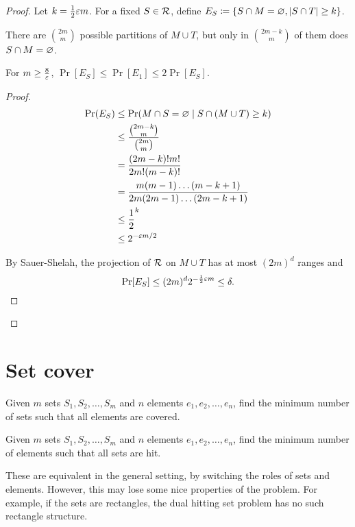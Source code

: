 \begin{proof}
    Let $k = \frac12 \varepsilon m$.
    For a fixed $S \in \mathcal{R}$, define
    $E_S \coloneq \{S \cap M = \varnothing, \lvert S \cap T\rvert \ge k\}$.

    There are $\binom{2m}{m}$ possible partitions of $M \cup T$, but only
    in $\binom{2m-k}{m}$ of them does $S \cap M = \varnothing$.
    \begin{lemma}
        For $m \ge \frac8{\varepsilon}$,
        $\Pr[E_S] \le \Pr[E_1] \le 2 \Pr[E_S]$.
    \end{lemma}
    \begin{proof}
        \begin{align*}
            \Pr(E_S) &\le \Pr(M \cap S = \varnothing \mid S \cap (M \cup T) \ge k) \\
            &\le \frac{\binom{2m-k}{m}}{\binom{2m}{m}} \\
            &= \frac{(2m-k)!m!}{2m!(m-k)!} \\
            &= \frac{m(m-1)\dots(m-k+1)}{2m(2m-1)\dots(2m-k+1)} \\
            &\le \frac12^k \\
            &\le 2^{-\varepsilon m / 2} \qedhere
        \end{align*}

        By Sauer-Shelah, the projection of $\mathcal{R}$ on $M \cup T$ has at most
        $(2m)^d$ ranges and \[
            \Pr[E_S] \le (2m)^d 2^{-\frac12 \varepsilon m} \le \delta.
        \]
    \end{proof}
\end{proof}

\section{Set cover} \label{sec:set-cover}
\begin{question*}
    Given $m$ sets $S_1, S_2, \dots, S_m$ and $n$ elements
    $e_1, e_2, \dots, e_n$,
    find the minimum number of sets such that all elements are covered.
\end{question*}

\begin{question*}
    Given $m$ sets $S_1, S_2, \dots, S_m$ and $n$ elements
    $e_1, e_2, \dots, e_n$,
    find the minimum number of elements such that all sets are hit.
\end{question*}

These are equivalent in the general setting, by switching the roles of
sets and elements.
However, this may lose some nice properties of the problem.
For example, if the sets are rectangles, the dual hitting set problem
has no such rectangle structure.

